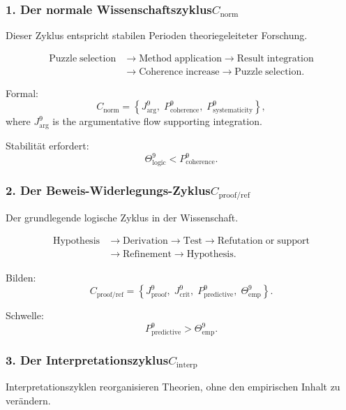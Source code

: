 \subsubsection{1. Der normale Wissenschaftszyklus$C_{\mathrm{norm}}$}

Dieser Zyklus entspricht stabilen Perioden theoriegeleiteter Forschung.

\[
  \begin{aligned}
  \mathrm{Puzzle\;selection}
  &\to \mathrm{Method\;application}
  \to \mathrm{Result\;integration}\\
  &\to \mathrm{Coherence\;increase}
  \to \mathrm{Puzzle\;selection}.
  \end{aligned}
\]

Formal:
\[
 C_{\mathrm{norm}}
 =
 \left\{
   J^9_{\mathrm{arg}},\;
   P^9_{\mathrm{coherence}},\;
   P^9_{\mathrm{systematicity}}
 \right\},
\]
where $J^9_{\mathrm{arg}}$ is the argumentative flow supporting integration.

Stabilität erfordert:
\[
  \Theta^9_\mathrm{logic} < P^9_{\mathrm{coherence}}.
\]


\subsubsection{2. Der Beweis-Widerlegungs-Zyklus$C_{\mathrm{proof/ref}}$}

Der grundlegende logische Zyklus in der Wissenschaft.

\[
  \begin{aligned}
  \mathrm{Hypothesis}
  &\to \mathrm{Derivation}
  \to \mathrm{Test}
  \to \mathrm{Refutation\;or\;support}\\
  &\to \mathrm{Refinement}
  \to \mathrm{Hypothesis}.
  \end{aligned}
\]

Bilden:
\[
 C_{\mathrm{proof/ref}}
  =
  \left\{
    J^9_{\mathrm{proof}},\;
    J^9_{\mathrm{crit}},\;
    P^9_{\mathrm{predictive}},\;
    \Theta^9_{\mathrm{emp}}
  \right\}.
\]

Schwelle:
\[
  P^9_{\mathrm{predictive}} > \Theta^9_\mathrm{emp}.
\]


\subsubsection{3. Der Interpretationszyklus$C_{\mathrm{interp}}$}

Interpretationszyklen reorganisieren Theorien, ohne den empirischen Inhalt zu verändern.

